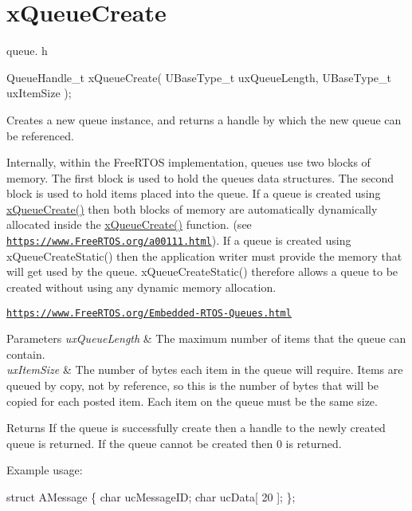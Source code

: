 \hypertarget{group__x_queue_create}{}\section{x\+Queue\+Create}
\label{group__x_queue_create}
queue. h 
\begin{DoxyPre}
QueueHandle\_t xQueueCreate(
                           UBaseType\_t uxQueueLength,
                           UBaseType\_t uxItemSize
                       );
\end{DoxyPre}


Creates a new queue instance, and returns a handle by which the new queue can be referenced.

Internally, within the Free\+R\+T\+OS implementation, queues use two blocks of memory. The first block is used to hold the queue\textquotesingle{}s data structures. The second block is used to hold items placed into the queue. If a queue is created using \hyperlink{vendor_2ceedling_2plugins_2freertos_2src_2freertos_2include_2queue_8h_aeb858b824bd74a934ea7ebb81af2a6bb}{x\+Queue\+Create()} then both blocks of memory are automatically dynamically allocated inside the \hyperlink{vendor_2ceedling_2plugins_2freertos_2src_2freertos_2include_2queue_8h_aeb858b824bd74a934ea7ebb81af2a6bb}{x\+Queue\+Create()} function. (see \href{https://www.FreeRTOS.org/a00111.html}{\tt https\+://www.\+Free\+R\+T\+O\+S.\+org/a00111.\+html}). If a queue is created using x\+Queue\+Create\+Static() then the application writer must provide the memory that will get used by the queue. x\+Queue\+Create\+Static() therefore allows a queue to be created without using any dynamic memory allocation.

\href{https://www.FreeRTOS.org/Embedded-RTOS-Queues.html}{\tt https\+://www.\+Free\+R\+T\+O\+S.\+org/\+Embedded-\/\+R\+T\+O\+S-\/\+Queues.\+html}


\begin{DoxyParams}{Parameters}
{\em ux\+Queue\+Length} & The maximum number of items that the queue can contain.\\
\hline
{\em ux\+Item\+Size} & The number of bytes each item in the queue will require. Items are queued by copy, not by reference, so this is the number of bytes that will be copied for each posted item. Each item on the queue must be the same size.\\
\hline
\end{DoxyParams}
\begin{DoxyReturn}{Returns}
If the queue is successfully create then a handle to the newly created queue is returned. If the queue cannot be created then 0 is returned.
\end{DoxyReturn}
Example usage\+: 
\begin{DoxyPre}
struct AMessage
\{
 char ucMessageID;
 char ucData[ 20 ];
\};\end{DoxyPre}



